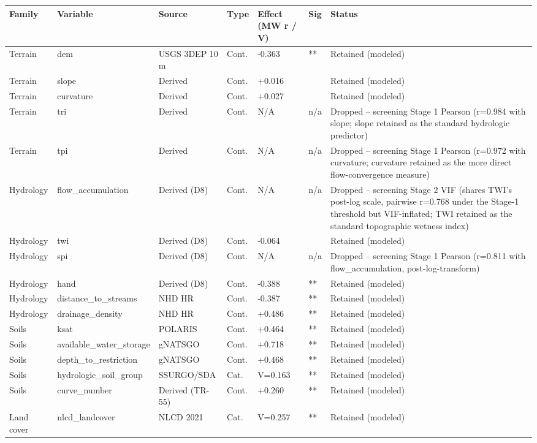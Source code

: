 \begin{tabular}{lllllll}
\toprule
Family & Variable & Source & Type & Effect (MW r / V) & Sig & Status \\
\midrule
Terrain & dem & USGS 3DEP 10 m & Cont. & -0.363 & ** & Retained (modeled) \\
Terrain & slope & Derived & Cont. & +0.016 &  & Retained (modeled) \\
Terrain & curvature & Derived & Cont. & +0.027 &  & Retained (modeled) \\
Terrain & tri & Derived & Cont. & N/A & n/a & Dropped -- screening Stage 1 Pearson (r=0.984 with slope; slope retained as the standard hydrologic predictor) \\
Terrain & tpi & Derived & Cont. & N/A & n/a & Dropped -- screening Stage 1 Pearson (r=0.972 with curvature; curvature retained as the more direct flow-convergence measure) \\
Hydrology & flow\_accumulation & Derived (D8) & Cont. & N/A & n/a & Dropped -- screening Stage 2 VIF (shares TWI's post-log scale, pairwise r=0.768 under the Stage-1 threshold but VIF-inflated; TWI retained as the standard topographic wetness index) \\
Hydrology & twi & Derived (D8) & Cont. & -0.064 &  & Retained (modeled) \\
Hydrology & spi & Derived (D8) & Cont. & N/A & n/a & Dropped -- screening Stage 1 Pearson (r=0.811 with flow\_accumulation, post-log-transform) \\
Hydrology & hand & Derived (D8) & Cont. & -0.388 & ** & Retained (modeled) \\
Hydrology & distance\_to\_streams & NHD HR & Cont. & -0.387 & ** & Retained (modeled) \\
Hydrology & drainage\_density & NHD HR & Cont. & +0.486 & ** & Retained (modeled) \\
Soils & ksat & POLARIS & Cont. & +0.464 & ** & Retained (modeled) \\
Soils & available\_water\_storage & gNATSGO & Cont. & +0.718 & ** & Retained (modeled) \\
Soils & depth\_to\_restriction & gNATSGO & Cont. & +0.468 & ** & Retained (modeled) \\
Soils & hydrologic\_soil\_group & SSURGO/SDA & Cat. & V=0.163 & ** & Retained (modeled) \\
Soils & curve\_number & Derived (TR-55) & Cont. & +0.260 & ** & Retained (modeled) \\
Land cover & nlcd\_landcover & NLCD 2021 & Cat. & V=0.257 & ** & Retained (modeled) \\

\end{tabular}
